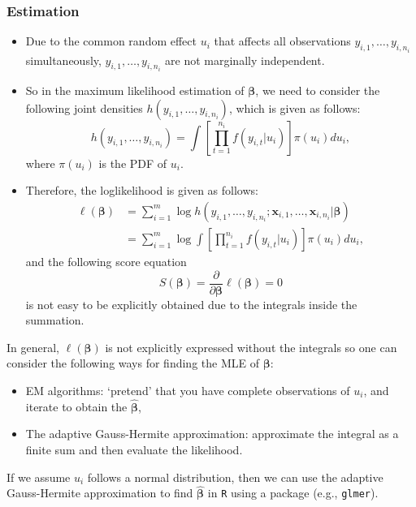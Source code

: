 \documentclass[ignorenonframetext,]{beamer}
\begin{document}
\begin{frame}[allowframebreaks]
\frametitle{Estimation}

\begin{itemize}
	\item Due to the common random effect $u_i$ that affects all observations $y_{i,1}, \ldots, y_{i,n_i}$ simultaneously, $y_{i,1}, \ldots, y_{i,n_i}$ are not marginally independent.
	\item So in the maximum likelihood estimation of $\bm{\beta}$, we need to consider the following joint densities $h(y_{i,1}, \ldots, y_{i,n_i})$, which is given as follows:
	$$
	h(y_{i,1}, \ldots, y_{i,n_i}) = \int \left[ \prod_{t=1}^{n_i} f(y_{i,t}|u_i) \right] \pi(u_i) du_i,
	$$
	where $\pi(u_i)$ is the PDF of $u_i$.
\end{itemize}

\framebreak

\begin{itemize}
	\item Therefore, the loglikelihood is given as follows:
	\begin{align*}
	\ell(\bm{\beta}) &= \sum_{i=1}^m \log h(y_{i,1}, \ldots, y_{i,n_i}; \mathbf{x}_{i,1}, \ldots, \mathbf{x}_{i,n_i} | \bm{\beta}) \\
	&= \sum_{i=1}^m \log \int \left[ \prod_{t=1}^{n_i} f(y_{i,t}|u_i) \right] \pi(u_i) du_i,
	\end{align*}
	and the following score equation
	$$
	S(\bm{\beta}) = \frac{\partial}{\partial \bm{\beta}} \ell(\bm{\beta}) = 0
	$$
	is not easy to be explicitly obtained due to the integrals inside the summation.
\end{itemize}

\framebreak

In general, $\ell(\bm{\beta})$ is not explicitly expressed without the integrals so one can consider the following ways for finding the MLE of $\bm{\beta}$:
\begin{itemize}
	\item EM algorithms: `pretend' that you have complete observations of $u_i$, and iterate to obtain the $\hat{\bm{\beta}}$,
	\item The adaptive Gauss-Hermite approximation: approximate the integral as a finite sum and then evaluate the likelihood.
\end{itemize}
If we assume $u_i$ follows a normal distribution, then we can use the adaptive Gauss-Hermite approximation to find $\hat{\bm{\beta}}$ in \texttt{R} using a package (e.g., \texttt{glmer}).


\end{frame}
\end{document}
